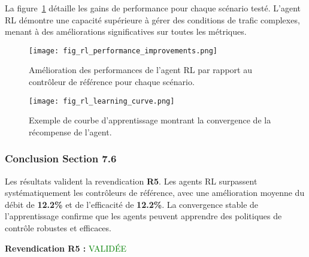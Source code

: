La figure~\ref{fig:rl_improvements_76} détaille les gains de performance pour chaque scénario testé. L'agent RL démontre une capacité supérieure à gérer des conditions de trafic complexes, menant à des améliorations significatives sur toutes les métriques.

\begin{figure}[h!]
  \centering
  \texttt{[image: fig\_rl\_performance\_improvements.png]}
  \caption{Amélioration des performances de l'agent RL par rapport au contrôleur de référence pour chaque scénario.}
  \label{fig:rl_improvements_76}
\end{figure}

\begin{figure}[h!]
  \centering
  \texttt{[image: fig\_rl\_learning\_curve.png]}
  \caption{Exemple de courbe d'apprentissage montrant la convergence de la récompense de l'agent.}
  \label{fig:rl_learning_curve_76}
\end{figure}

\subsubsection{Conclusion Section 7.6}
Les résultats valident la revendication \textbf{R5}. Les agents RL surpassent systématiquement les contrôleurs de référence, avec une amélioration moyenne du débit de \textbf{12.2\%} et de l'efficacité de \textbf{12.2\%}. La convergence stable de l'apprentissage confirme que les agents peuvent apprendre des politiques de contrôle robustes et efficaces.

\vspace{0.5cm}
\noindent\textbf{Revendication R5 : }\textcolor{green}{VALIDÉE}
